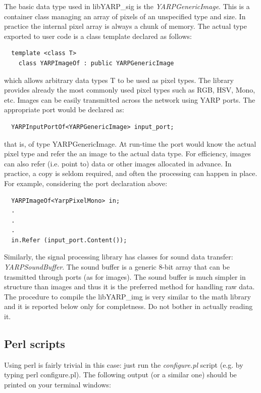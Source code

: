 The basic data type used in libYARP\_sig is the {\em YARPGenericImage}. This is a container class managing an array of pixels of an unspecified type and size. In practice the internal pixel array is always a chunk of memory. The actual type exported to user code is a class template declared as follows:

\begin{verbatim}
  template <class T>
    class YARPImageOf : public YARPGenericImage
\end{verbatim}

\noindent which allows arbitrary data types T to be used as pixel types. The library provides already the most commonly used pixel types such as RGB, HSV, Mono, etc. Images can be easily transmitted across the network using YARP ports. The appropriate port would be declared as:

\begin{verbatim}
  YARPInputPortOf<YARPGenericImage> input_port;
\end{verbatim}

\noindent that is, of type YARPGenericImage. At run-time the port would know the actual pixel type and refer the an image to the actual data type. For efficiency, images can also refer (i.e. point to) data or other images allocated in advance. In practice, a copy is seldom required, and often the processing can happen in place. For example, considering the port declaration above:

\begin{verbatim}
  YARPImageOf<YarpPixelMono> in;
  .
  .
  .
  in.Refer (input_port.Content());	
\end{verbatim}

Similarly, the signal processing library has classes for sound data transfer: {\em YARPSoundBuffer}. The sound buffer is a generic 8-bit array that can be trasmitted through ports (as for images). The sound buffer is much simpler in structure than images and thus it is the preferred method for handling raw data. The procedure to compile the libYARP\_img is very similar to the math library and it is reported below only for completness. Do not bother in actually reading it.

\subsection{Perl scripts}
Using perl is fairly trivial in this case: just run the {\em configure.pl} script (e.g. by typing perl configure.pl). The following output (or a similar one) should be printed on your terminal windows:

